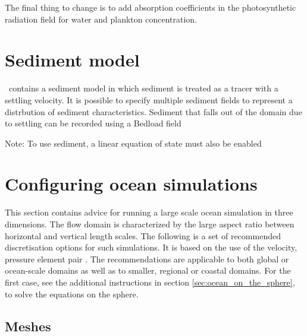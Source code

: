 The final thing to change is to add absorption coefficients in the photosynthetic radiation field for water and plankton concentration.

\section{Sediment model}
\label{config:sediments}

\fluidity\ contains a sediment model in which sediment is treated as a
tracer with a settling velocity. 
It is possible to specify multiple sediment fields to represent a distrbution of sediment
characteristics.
Sediment that falls out of the domain due to settling can be recorded using a
Bedload field

Note: To use sediment, a linear equation of state must also be enabled

\section{Configuring ocean simulations}
\label{sec:large-scale-ocean}

This section contains advice for running a large scale ocean simulation in
three dimensions. The flow domain is characterized by the large aspect ratio
between horizontal and vertical length scales. The following is a set of
recommended discretisation options for such simulations. It is based on the use
of the \PoDGPt velocity, pressure element pair \citep{cotter2009}. The
recommendations are applicable to both global or ocean-scale domains as well as
to smaller, regional or coastal domains. For the first case, see the additional
instructions in section \ref{sec:ocean_on_the_sphere}, to solve the equations
on the sphere.

\subsection{Meshes}

